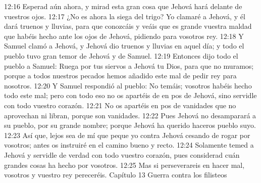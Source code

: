 12:16 Esperad aún ahora, y mirad esta gran cosa que Jehová hará delante de vuestros ojos.  
12:17 ¿No es ahora la siega del trigo? Yo clamaré a Jehová, y él dará truenos y lluvias, para que conozcáis y veáis que es grande vuestra maldad que habéis hecho ante los ojos de Jehová, pidiendo para vosotros rey.  
12:18 Y Samuel clamó a Jehová, y Jehová dio truenos y lluvias en aquel día; y todo el pueblo tuvo gran temor de Jehová y de Samuel.  
12:19 Entonces dijo todo el pueblo a Samuel: Ruega por tus siervos a Jehová tu Dios, para que no muramos; porque a todos nuestros pecados hemos añadido este mal de pedir rey para nosotros.  
12:20 Y Samuel respondió al pueblo: No temáis; vosotros habéis hecho todo este mal; pero con todo eso no os apartéis de en pos de Jehová, sino servidle con todo vuestro corazón.  
12:21 No os apartéis en pos de vanidades que no aprovechan ni libran, porque son vanidades.  
12:22 Pues Jehová no desamparará a su pueblo, por su grande nombre; porque Jehová ha querido haceros pueblo suyo.  
12:23 Así que, lejos sea de mí que peque yo contra Jehová cesando de rogar por vosotros; antes os instruiré en el camino bueno y recto.  
12:24 Solamente temed a Jehová y servidle de verdad con todo vuestro corazón, pues considerad cuán grandes cosas ha hecho por vosotros.  
12:25 Mas si perseverareis en hacer mal, vosotros y vuestro rey pereceréis.  
Capítulo 13
Guerra contra los filisteos  

